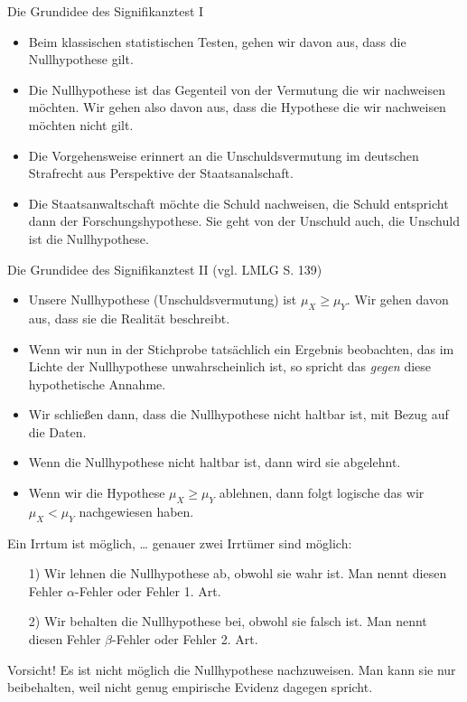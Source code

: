 \documentclass[usenames,dvipsnames,handout]{beamer}
\begin{document}
\begin{frame}{Die Grundidee des Signifikanztest I}
\begin{itemize}
\item{Beim klassischen statistischen Testen, gehen wir davon aus, dass die Nullhypothese gilt.}\pause
\item{Die Nullhypothese ist das Gegenteil von der Vermutung die wir nachweisen möchten. Wir gehen also davon aus,
dass die Hypothese die wir nachweisen möchten nicht gilt.}\pause
\item{Die Vorgehensweise erinnert an die Unschuldsvermutung im deutschen Strafrecht aus Perspektive der Staatsanalschaft.}\pause
\item{Die Staatsanwaltschaft möchte die Schuld nachweisen, die Schuld entspricht dann der Forschungshypothese.
Sie geht von der Unschuld auch, die Unschuld ist die Nullhypothese.}
\end{itemize}
\end{frame}

\begin{frame}{Die Grundidee des Signifikanztest II (vgl. LMLG S. 139)}
\begin{itemize}
\item{Unsere Nullhypothese (Unschuldsvermutung) ist $\mu_{X} \geq \mu_{Y}.$ Wir gehen davon aus, dass sie die Realität
beschreibt.}\pause
\item{Wenn wir nun in der Stichprobe tatsächlich ein Ergebnis beobachten, das im Lichte der Nullhypothese unwahrscheinlich ist, so spricht
das \textit{gegen} diese hypothetische Annahme. }\pause
\item{Wir schließen dann, dass die Nullhypothese nicht haltbar ist, mit Bezug auf die Daten.}\pause
\item{Wenn die Nullhypothese nicht haltbar ist, dann wird sie abgelehnt. }
\item{Wenn wir die Hypothese $\mu_{X} \geq \mu_{Y}$ ablehnen, dann folgt logische das wir $\mu_{X} < \mu_{Y}$ nachgewiesen haben.}
\end{itemize}
\end{frame}


\begin{frame}{Ein Irrtum ist möglich, \dots}
genauer zwei Irrtümer sind möglich:
\begin{itemize}
\item[1)]{Wir lehnen die Nullhypothese ab, obwohl sie wahr ist. Man nennt diesen Fehler $\alpha$-Fehler oder Fehler 1. Art.}
\item[2)]{Wir behalten die Nullhypothese bei, obwohl sie falsch ist. Man nennt diesen Fehler $\beta$-Fehler oder Fehler 2. Art.}
\end{itemize}
\begin{block}{Vorsicht!}
Es ist nicht möglich die Nullhypothese nachzuweisen. Man kann sie nur beibehalten, weil nicht genug empirische 
Evidenz dagegen spricht.
\end{block}
\end{frame}
\end{document}
